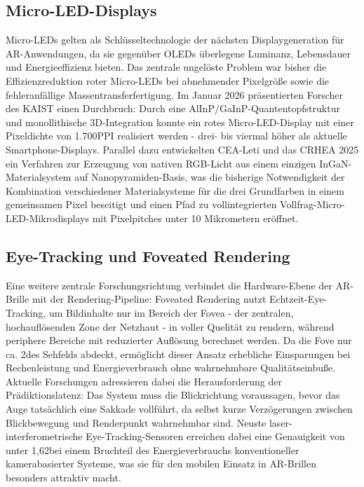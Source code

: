 \subsection{Micro-LED-Displays}
\label{subsec:MicroLed}
Micro-LEDs gelten als Schlüsseltechnologie der nächsten Displaygeneration für \ac{AR}-Anwendungen, da sie gegenüber OLEDs überlegene Luminanz, Lebensdauer und Energieeffizienz bieten. Das zentrale ungelöste Problem war bisher die Effizienzreduktion roter Micro-LEDs bei abnehmender Pixelgröße sowie die fehleranfällige Massentransferfertigung. Im Januar 2026 präsentierten Forscher des \ac{KAIST} einen Durchbruch: Durch eine AlInP/GaInP-Quantentopfstruktur und monollithische 3D-Integration konnte ein rotes Micro-LED-Display mit einer Pixeldichte von 1.700PPI realisiert werden - drei- bis viermal höher als aktuelle Smartphone-Displays. Parallel dazu entwickelten \ac{CEA}-Leti und das \ac{CRHEA} 2025 ein Verfahren zur Erzeugung von nativen RGB-Licht aus einem einzigen InGaN-Materialsystem auf Nanopyramiden-Basis, was die bisherige Notwendigkeit der Kombination verschiedener Materialsysteme für die drei Grundfarben in einem gemeinsamen Pixel beseitigt und einen Pfad zu vollintegrierten Vollfrag-Micro-LED-Mikrodisplays mit Pixelpitches unter 10 Mikrometern eröffnet.

\subsection{Eye-Tracking und Foveated Rendering}
\label{subsec:eyetrackundfoveated}
Eine weitere zentrale Forschungsrichtung verbindet die Hardware-Ebene der \ac{AR}-Brille mit der Rendering-Pipeline: Foveated Rendering nutzt Echtzeit-Eye-Tracking, um Bildinhalte nur im Bereich der Fovea - der zentralen, hochauflösenden Zone der Netzhaut - in voller Quelität zu rendern, während periphere Bereiche mit reduzierter Auflösung berechnet werden. Da die Fove nur ca. 2\textdegree des Sehfelds abdeckt, ermöglicht dieser Ansatz erhebliche Einsparungen  bei Rechenleistung und Energieverbrauch ohne wahrnehmbare Qualitätseinbuße. Aktuelle Forschungen adressieren dabei die Herausforderung der Prädiktionslatenz: Das System muss die Blickrichtung voraussagen, bevor das Auge tatsächlich eine Sakkade vollführt, da selbst kurze Verzögerungen zwischen Blickbewegung und Renderpunkt wahrnehmbar sind. Neuste laser-interferometrische Eye-Tracking-Sensoren erreichen dabei eine Genauigkeit von unter 1,62\textdegree bei einem Bruchteil des Energieverbrauchs konventioneller kamerabasierter Systeme, was sie für den mobilen Einsatz in \ac{AR}-Brillen besonders attraktiv macht.

